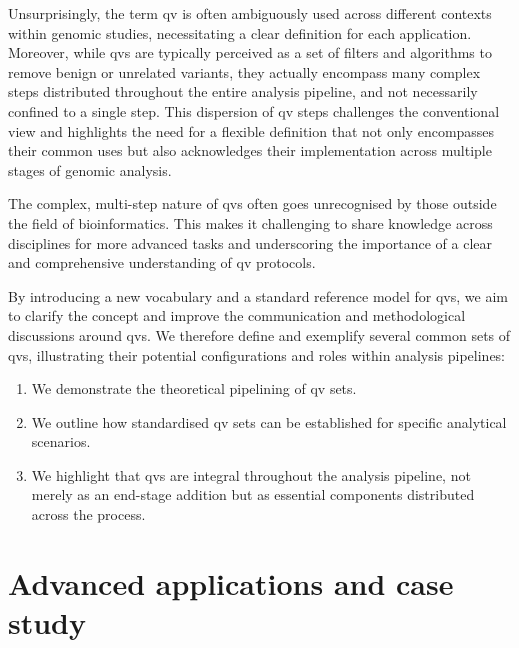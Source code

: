 Unsurprisingly, the term \ac{qv} is often ambiguously used across different contexts within genomic studies, necessitating a clear definition for each application. 
Moreover, while \ac{qv}s are typically perceived as a set of filters and algorithms to remove benign or unrelated variants, they actually encompass many complex steps distributed throughout the entire analysis pipeline, and not necessarily confined to a single step. 
This dispersion of \ac{qv} steps challenges the conventional view and highlights the need for a flexible definition that not only encompasses their common uses but also acknowledges their implementation across multiple stages of genomic analysis.

The complex, multi-step nature of \ac{qv}s often goes unrecognised by those outside the field of bioinformatics.
This makes it challenging to share knowledge across disciplines for more advanced tasks and underscoring the importance of a clear and comprehensive understanding of \ac{qv} protocols.

By introducing a new vocabulary and a standard reference model for \ac{qv}s, we aim to clarify the concept and improve the communication and methodological discussions around \ac{qv}s. 
We therefore define and exemplify several common sets of \ac{qv}s, illustrating their potential configurations and roles within analysis pipelines:

\begin{enumerate}
    \item We demonstrate the theoretical pipelining of \ac{qv} sets.
    \item We outline how standardised \ac{qv} sets can be established for specific analytical scenarios.
    \item We highlight that \ac{qv}s are integral throughout the analysis pipeline, not merely as an end-stage addition but as essential components distributed across the process.
\end{enumerate}

\section{Advanced applications and case study}
